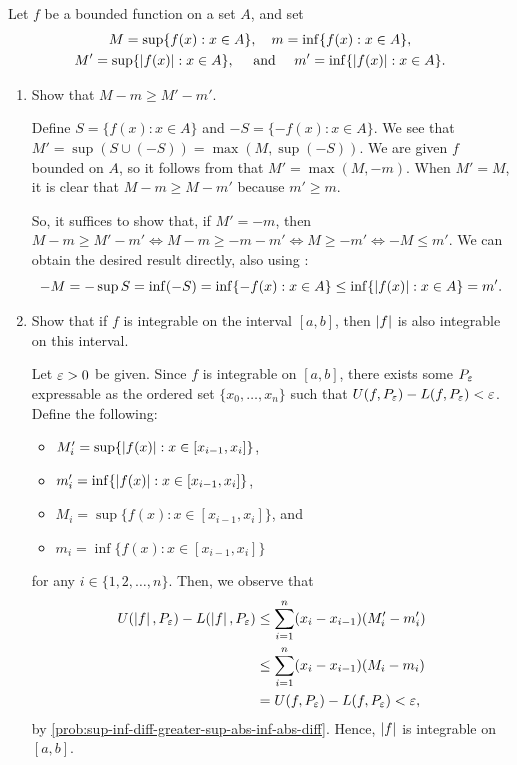 \begin{problem}
  Let $f$ be a bounded function on a set $A$, and set
  \begin{gather*}
    M = \sup \{ f(x) : x \in A \}, \quad m = \inf \{ f(x) : x \in A \},\\
    M' = \sup \{ \left\lvert f(x) \right\rvert: x \in A \}, \quad \text{ and } \quad m' = \inf \{ \left\lvert f(x) \right\rvert : x \in A \}.
  \end{gather*}

  \begin{enumerate}[label=(\alph*)]
    \item Show that $M - m \geq M' - m'$. \label{prob:sup-inf-diff-greater-sup-abs-inf-abs-diff}

        Define $S = \{ f(x) : x \in A \}$ and $-S = \{ -f(x) : x \in A \}$. We see that $M' = \sup (S \cup (-S)) = \max(M, \sup (-S))$.
        We are given $f$ bounded on $A$, so it follows from  that
        $M' = \max(M, -m)$. When $M' = M$, it is clear that $M - m \geq M - m'$ because $m' \geq m$.

        So, it suffices to show that, if $M' = -m$, then $M - m \geq M' - m' \iff M - m \geq -m - m' \iff M \geq -m' \iff -M \leq m'$.
        We can obtain the desired result directly, also using :
        \[
          -M = -\sup S = \inf(-S) = \inf \{ -f(x) : x \in A \} \leq \inf \{ \left\lvert f(x) \right\rvert : x \in A \} = m'.
        \]


    \item Show that if $f$ is integrable on the interval $[a, b]$, then $\left\lvert f \right\rvert$ is also integrable
      on this interval. \label{prob:integ-implied-integ-abs}

      Let $\varepsilon > 0$ be given. Since $f$ is integrable on $[a,b]$, there exists some $P_{\varepsilon}$ expressable as 
      the ordered set $\{ x_{0}, \ldots, x_{n} \}$ such that $U(f, P_{\varepsilon}) - L(f, P_{\varepsilon}) < \varepsilon$. Define the following: 
      \begin{itemize}
        \item $M_{i}' = \sup \{ \left\lvert f(x) \right\rvert : x \in [x_{i-1}, x_{i}] \}$,
        \item $m_{i}' = \inf \{ \left\lvert f(x) \right\rvert : x \in [x_{i-1}, x_{i}] \}$,
        \item $M_{i} = \sup \{ f(x) : x \in [x_{i-1}, x_{i}] \}$, and
        \item $m_{i} = \inf \{ f(x) : x \in [x_{i-1}, x_{i}] \}$
      \end{itemize}
      for any $i \in \{ 1, 2, \ldots, n \}$.
      Then, we observe that
      \begin{align*}
        U(\left\lvert f \right\rvert, P_{\varepsilon}) - L(\left\lvert f \right\rvert, P_{\varepsilon}) 
        &\leq \sum_{i=1}^{n} (x_{i} - x_{i-1}) (M_{i}' - m_{i}') \\
        &\leq \sum_{i=1}^{n} (x_{i} - x_{i-1}) (M_{i} - m_{i}) \\ 
        &= U(f, P_{\varepsilon}) - L(f, P_{\varepsilon}) < \varepsilon,
      \end{align*}
      by \ref{prob:sup-inf-diff-greater-sup-abs-inf-abs-diff}. Hence, $\left\lvert f \right\rvert$ is integrable on $[a, b]$.


\end{enumerate}
\end{problem}

